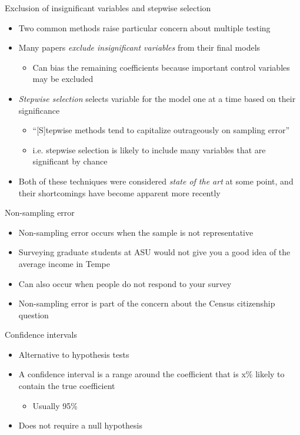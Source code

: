 \begin{frame}{Exclusion of insignificant variables and stepwise selection}
  \begin{itemize}
    \item Two common methods raise particular concern about multiple testing
    \item Many papers \emph{exclude insignificant variables} from their final models
    \begin{itemize}
      \item Can bias the remaining coefficients because important control variables may be excluded
    \end{itemize}
    \item \emph{Stepwise selection} selects variable for the model one at a time based on their significance
    \begin{itemize}
      \item ``[S]tepwise methods tend to capitalize outrageously on sampling error'' \autocite{thompson_stepwise_1995}
      \item i.e. stepwise selection is likely to include many variables that are significant by chance
    \end{itemize}
    \item Both of these techniques were considered \emph{state of the art} at some point, and their shortcomings have become apparent more recently
  \end{itemize}
\end{frame}

\begin{frame}{Non-sampling error}
  \begin{itemize}
    \item Non-sampling error occurs when the sample is not representative
    \item Surveying graduate students at ASU would not give you a good idea of the average income in Tempe
    \item Can also occur when people do not respond to your survey
    \item Non-sampling error is part of the concern about the Census citizenship question
  \end{itemize}
\end{frame}

\begin{frame}{Confidence intervals}
  \begin{itemize}
    \item Alternative to hypothesis tests
    \item A confidence interval is a range around the coefficient that is x\% likely to contain the true coefficient
    \begin{itemize}
      \item Usually 95\%
    \end{itemize}
    \item Does not require a null hypothesis
  \end{itemize}
\end{frame}

